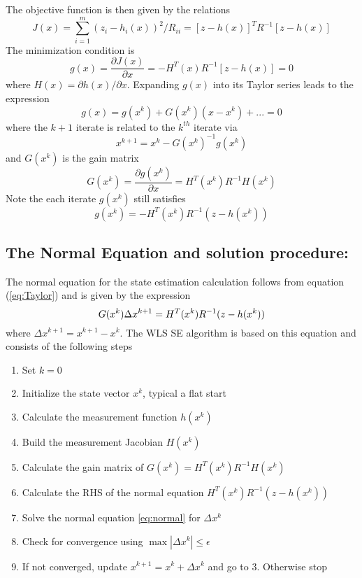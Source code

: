 \documentclass[12pt]{article}
\begin{document}
The objective function is then given by the relations
\begin{equation}\label{eq:JX}
J(x)=\sum_{i=1}^{m}(z_i-h_i(x))^2/R_{ii} = [z-h(x)]^TR^{-1}[z-h(x)] 
\end{equation} 
The minimization condition is
\begin{equation}\label{eq:gx}
g(x)=\frac{\partial J(x)}{\partial x} = -H^T(x)R^{-1}[z-h(x)] = 0 
\end{equation} 
where $H(x)=\partial h(x)/\partial x$. Expanding $g(x)$ into its Taylor series
leads to the expression
\begin{equation}\label{eq:Taylor}
g(x)= g(x^k) + G(x^k)(x-x^k) + ... = 0
\end{equation} 
where the $k+1$ iterate is related to the $k^{th}$ iterate via
\[
x^{k+1} = x^k - G(x^k)^{-1}g(x^k)
\]
and $G(x^k)$ is the gain matrix
\[
G(x^k) = \frac{\partial g(x^k)}{\partial x} = H^T(x^k)R^{-1}H(x^k)
\]
Note the each iterate $g(x^k)$ still satisfies
\[
g(x^k) = -H^T(x^k)R^{-1}(z-h(x^k))
\]

\subsection*{The Normal Equation and solution procedure:}
The normal equation for the state estimation calculation follows from
equation (\ref{eq:Taylor}) and is given by the expression
\begin{equation}\label{eq:normal}
G(x^k)\Delta x^{k+1} = H^T(x^k)R^{-1}(z-h(x^k)) \\*
\end{equation} 
where $\Delta x^{k+1} = x^{k+1}-x^k$. The WLS SE algorithm is based on this
equation and consists of the following steps
\begin{enumerate}
\item Set $k=0$
\item Initialize the state vector $x^{k}$, typical a flat start
\item Calculate the measurement function $h(x^k)$
\item Build the measurement Jacobian $H(x^k)$
\item Calculate the gain matrix of $G(x^k)= H^T(x^k)R^{-1}H(x^k)$
\item Calculate the RHS of the normal equation $H^T(x^k)R^{-1}(z-h(x^k))$
\item Solve the normal equation \ref{eq:normal} for $\Delta x^k$
\item Check for convergence using $\max \left |  \Delta x^k \right |\le \epsilon $
\item If not converged, update $x^{k+1} = x^k+\Delta x^k$ and go to 3. Otherwise
stop
\end{enumerate}
\end{document}
